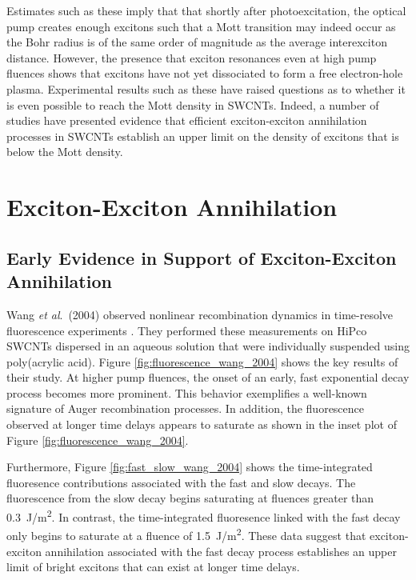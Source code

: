 Estimates such as these imply that that shortly after photoexcitation, the optical pump creates enough excitons such that a Mott transition may indeed occur as the Bohr radius is of the same order of magnitude as the average interexciton distance. However, the presence that exciton resonances even at high pump fluences shows that excitons have not yet dissociated to form a free electron-hole plasma. Experimental results such as these have raised questions as to whether it is even possible to reach the Mott density in SWCNTs. Indeed, a number of studies have presented evidence that efficient exciton-exciton annihilation processes in SWCNTs establish an upper limit on the density of excitons that is below the Mott density.


\section{Exciton-Exciton Annihilation}

\subsection{Early Evidence in Support of Exciton-Exciton Annihilation}

Wang \textit{et al}.\ (2004) observed nonlinear recombination dynamics in time-resolve fluorescence experiments \cite{wang2004observation}. They performed these measurements on HiPco SWCNTs dispersed in an aqueous solution that were individually suspended using poly(acrylic acid). Figure \ref{fig:fluorescence_wang_2004} shows the key results of their study. At higher pump fluences, the onset of an early, fast exponential decay process becomes more prominent. This behavior exemplifies a well-known signature of Auger recombination processes. In addition, the fluorescence observed at longer time delays appears to saturate as shown in the inset plot of Figure \ref{fig:fluorescence_wang_2004}.

Furthermore, Figure \ref{fig:fast_slow_wang_2004} shows the time-integrated fluoresence contributions associated with the fast and slow decays. The fluorescence from the slow decay begins saturating at fluences greater than \SI{0.3}{\joule / \meter\squared}. In contrast, the time-integrated fluoresence linked with the fast decay only begins to saturate at a fluence of \SI{1.5}{\joule / \meter\squared}. These data suggest that exciton-exciton annihilation associated with the fast decay process establishes an upper limit of bright excitons that can exist at longer time delays.



